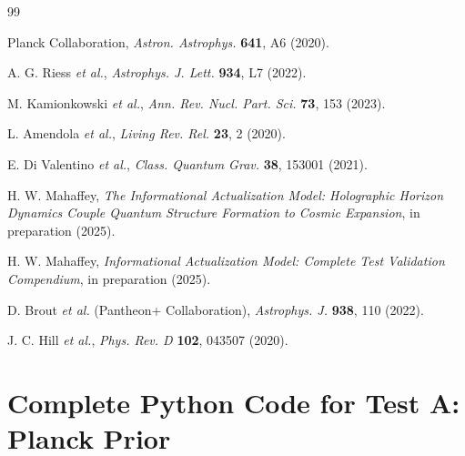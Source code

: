\documentclass[twocolumn,superscriptaddress,prd,amsmath,amssymb]{revtex4-2}
\begin{document}
\begin{thebibliography}{99}

Planck Collaboration,
\textit{Astron. Astrophys.} \textbf{641}, A6 (2020).

A. G. Riess \textit{et al.},
\textit{Astrophys. J. Lett.} \textbf{934}, L7 (2022).

M. Kamionkowski \textit{et al.},
\textit{Ann. Rev. Nucl. Part. Sci.} \textbf{73}, 153 (2023).

L. Amendola \textit{et al.},
\textit{Living Rev. Rel.} \textbf{23}, 2 (2020).

E. Di Valentino \textit{et al.},
\textit{Class. Quantum Grav.} \textbf{38}, 153001 (2021).

H. W. Mahaffey,
\textit{The Informational Actualization Model: Holographic Horizon Dynamics Couple Quantum Structure Formation to Cosmic Expansion},
in preparation (2025).

H. W. Mahaffey,
\textit{Informational Actualization Model: Complete Test Validation Compendium},
in preparation (2025).

D. Brout \textit{et al.} (Pantheon+ Collaboration),
\textit{Astrophys. J.} \textbf{938}, 110 (2022).

J. C. Hill \textit{et al.},
\textit{Phys. Rev. D} \textbf{102}, 043507 (2020).

\end{thebibliography}

\clearpage

\appendix

\section{Complete Python Code for Test A: Planck Prior}
\label{app:test_a}
\end{document}
